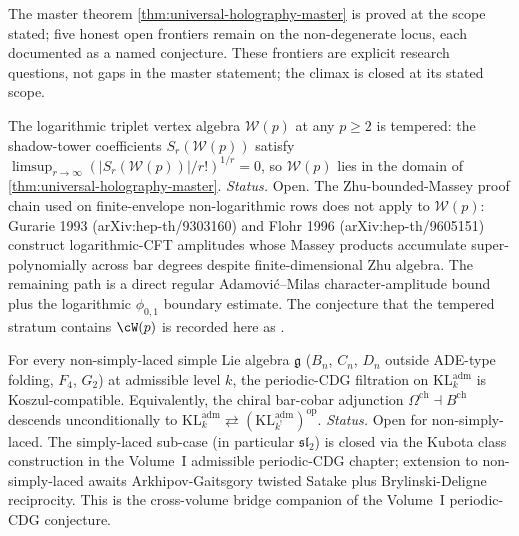 The master theorem \cref{thm:universal-holography-master} is
proved at the scope stated; five honest open frontiers remain on
the non-degenerate locus, each documented as a named conjecture.
These frontiers are explicit research questions, not gaps in the
master statement; the climax is closed at its stated scope.

\begin{conjecture}
\ClaimStatusConjectured
The logarithmic triplet vertex algebra $\mathcal{W}(p)$ at any
$p \ge 2$ is tempered: the shadow-tower coefficients $S_{r}(\mathcal{W}(p))$
satisfy $\limsup_{r \to \infty} (|S_{r}(\mathcal{W}(p))|/r!)^{1/r}
= 0$, so $\mathcal{W}(p)$ lies in the domain of
\cref{thm:universal-holography-master}.
\emph{Status.} Open. The Zhu-bounded-Massey proof chain used on
finite-envelope non-logarithmic rows does not apply to $\mathcal{W}(p)$:
Gurarie 1993 (arXiv:hep-th/9303160) and Flohr 1996
(arXiv:hep-th/9605151) construct logarithmic-CFT amplitudes whose
Massey products accumulate super-polynomially across bar degrees
despite finite-dimensional Zhu algebra. The remaining path is a
direct regular Adamovi\'c--Milas character-amplitude bound plus the
logarithmic $\phi_{0,1}$ boundary estimate. The conjecture that the
tempered stratum contains $\cW(p)$ is recorded here as
\ClaimStatusConjectured.
\end{conjecture}

\begin{conjecture}
\ClaimStatusConjectured
For every non-simply-laced simple Lie algebra $\mathfrak{g}$
($B_{n}$, $C_{n}$, $D_{n}$ outside ADE-type folding,
$F_{4}$, $G_{2}$) at admissible level $k$, the periodic-CDG
filtration on $\mathrm{KL}_{k}^{\mathrm{adm}}$ is
Koszul-compatible. Equivalently, the chiral bar-cobar adjunction
$\Omega^{\mathrm{ch}} \dashv B^{\mathrm{ch}}$ descends
unconditionally to
$\mathrm{KL}_{k}^{\mathrm{adm}} \rightleftarrows
(\mathrm{KL}_{k^{!}}^{\mathrm{adm}})^{\mathrm{op}}$.
\emph{Status.} Open for non-simply-laced. The simply-laced sub-case
(in particular $\mathfrak{sl}_{2}$) is closed via the Kubota class
construction in the Volume~I admissible periodic-CDG chapter;
extension to non-simply-laced awaits Arkhipov-Gaitsgory twisted
Satake plus Brylinski-Deligne reciprocity. This is the
cross-volume bridge companion of the Volume~I periodic-CDG
conjecture.
\end{conjecture}

